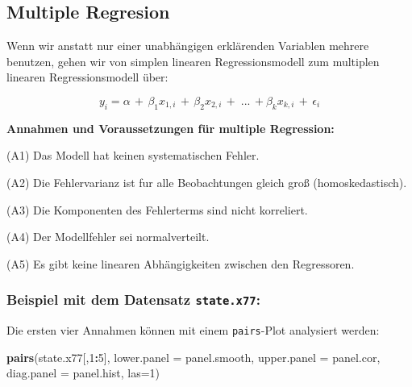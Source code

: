 \documentclass[
]{article}
\newenvironment{Shaded}{\begin{snugshade}}{\end{snugshade}}
\newcommand{\AttributeTok}[1]{\textcolor[rgb]{0.13,0.29,0.53}{#1}}
\newcommand{\DecValTok}[1]{\textcolor[rgb]{0.00,0.00,0.81}{#1}}
\newcommand{\FunctionTok}[1]{\textcolor[rgb]{0.13,0.29,0.53}{\textbf{#1}}}
\newcommand{\NormalTok}[1]{#1}
\newcommand{\SpecialCharTok}[1]{\textcolor[rgb]{0.81,0.36,0.00}{\textbf{#1}}}
\begin{document}
\endtcolorbox

\clearpage

\hypertarget{multiple-regresion}{%
\subsection{Multiple Regresion}\label{multiple-regresion}}

\tcolorbox

Wenn wir anstatt nur einer unabhängigen erklärenden Variablen mehrere
benutzen, gehen wir von simplen linearen Regressionsmodell zum multiplen
linearen Regressionsmodell über:

\[y_i = \alpha \, + \, \beta_1x_{1,i} \, + \, \beta_2x_{2,i} \, + \; ... \, + \beta_kx_{k,i} \, + \, \epsilon_i\]

\endtcolorbox

\tcolorbox

\textbf{Annahmen und Voraussetzungen für multiple Regression:}

(A1) Das Modell hat keinen systematischen Fehler.

(A2) Die Fehlervarianz ist fur alle Beobachtungen gleich groß
(homoskedastisch).

(A3) Die Komponenten des Fehlerterms sind nicht korreliert.

(A4) Der Modellfehler sei normalverteilt.

(A5) Es gibt keine linearen Abhängigkeiten zwischen den Regressoren.
\endtcolorbox

\hypertarget{beispiel-mit-dem-datensatz-state.x77}{%
\subsubsection{\texorpdfstring{Beispiel mit dem Datensatz
\texttt{state.x77}:}{Beispiel mit dem Datensatz state.x77:}}\label{beispiel-mit-dem-datensatz-state.x77}}

Die ersten vier Annahmen können mit einem \texttt{pairs}-Plot analysiert
werden:

\begin{Shaded}
\begin{Highlighting}[]
\FunctionTok{pairs}\NormalTok{(state.x77[,}\DecValTok{1}\SpecialCharTok{:}\DecValTok{5}\NormalTok{], }\AttributeTok{lower.panel =}\NormalTok{ panel.smooth, }\AttributeTok{upper.panel =}\NormalTok{ panel.cor,}
\AttributeTok{diag.panel =}\NormalTok{ panel.hist, }\AttributeTok{las=}\DecValTok{1}\NormalTok{)}
\end{Highlighting}
\end{Shaded}
\end{document}
